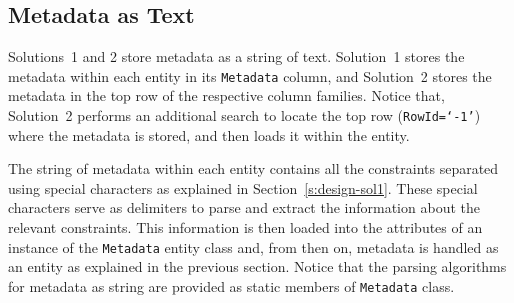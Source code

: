 \subsection{Metadata as Text}\label{ss:implementation-MDText}

Solutions~1 and 2 store metadata as a string of text. Solution~1 stores the
metadata within each entity in its  \texttt{Metadata} column, and
 Solution~2 stores the metadata in  the top row of the respective column
families. Notice that, Solution~2 performs an additional
 search to locate the  top row (\texttt{RowId=`-1'}) where the metadata is
 stored, and then loads it within the  entity.
 
The string of metadata within each entity contains all the constraints
 separated using special characters as explained in Section~\ref{s:design-sol1}.
These special characters serve as delimiters to
parse and extract the information about the relevant constraints. This
 information is then loaded into the attributes of an instance of the
\texttt{Metadata} entity class and, from then on, metadata is handled as an
 entity as explained in the previous section.  Notice that the parsing
algorithms for metadata as string are provided as static members of
\texttt{Metadata} class.
 

















